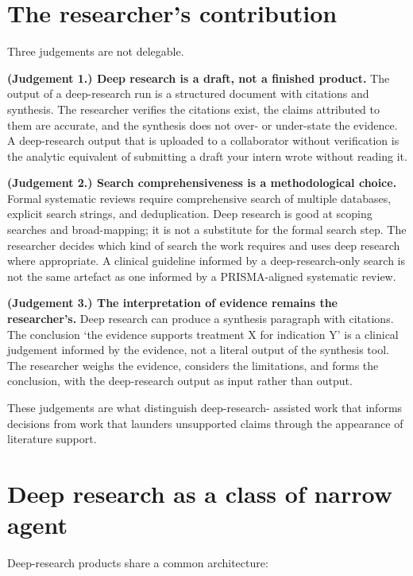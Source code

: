 \documentclass[
  letterpaper,
  11pt]{scrbook}
\begin{document}
\section{The researcher's contribution}\label{sec-deep-research-human}

Three judgements are not delegable.

\textbf{(Judgement 1.) Deep research is a draft, not a finished
product.} The output of a deep-research run is a structured document
with citations and synthesis. The researcher verifies the citations
exist, the claims attributed to them are accurate, and the synthesis
does not over- or under-state the evidence. A deep-research output that
is uploaded to a collaborator without verification is the analytic
equivalent of submitting a draft your intern wrote without reading it.

\textbf{(Judgement 2.) Search comprehensiveness is a methodological
choice.} Formal systematic reviews require comprehensive search of
multiple databases, explicit search strings, and deduplication. Deep
research is good at scoping searches and broad-mapping; it is not a
substitute for the formal search step. The researcher decides which kind
of search the work requires and uses deep research where appropriate. A
clinical guideline informed by a deep-research-only search is not the
same artefact as one informed by a PRISMA-aligned systematic review.

\textbf{(Judgement 3.) The interpretation of evidence remains the
researcher's.} Deep research can produce a synthesis paragraph with
citations. The conclusion `the evidence supports treatment X for
indication Y' is a clinical judgement informed by the evidence, not a
literal output of the synthesis tool. The researcher weighs the
evidence, considers the limitations, and forms the conclusion, with the
deep-research output as input rather than output.

These judgements are what distinguish deep-research- assisted work that
informs decisions from work that launders unsupported claims through the
appearance of literature support.

\section{Deep research as a class of narrow
agent}\label{deep-research-as-a-class-of-narrow-agent}

Deep-research products share a common architecture:
\end{document}
